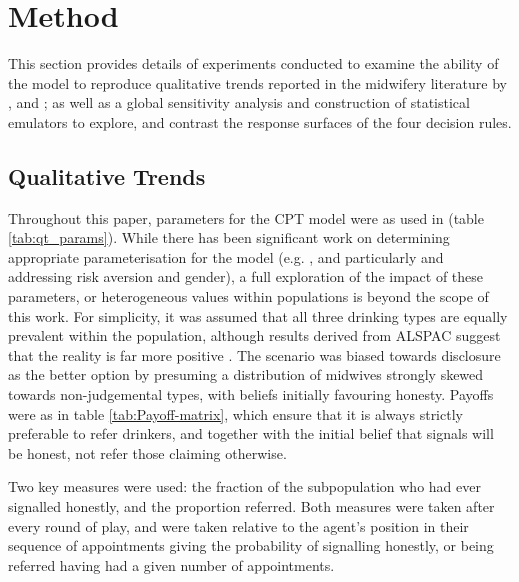 \section{Method}
\label{sec:method}

This section provides details of experiments conducted to examine the ability of the model to reproduce qualitative trends reported in the midwifery literature by \cite{Alvik2006}, and \cite{Phillips2007}; as well as a global sensitivity analysis and construction of statistical emulators to explore, and contrast the response surfaces of the four decision rules.

\subsection{Qualitative Trends}
\label{sub:qt}


Throughout this paper, parameters for the \ac{CPT} model were as used in \cite{Tversky1992} (table \ref{tab:qt_params}). While there has been significant work on determining appropriate parameterisation for the model (e.g. \cite{Neilson2002,Glockner2012,Nilsson2011}, and particularly \citet{Byrnes1999} and \citet{Booij2009} addressing risk aversion and gender), a full exploration of the impact of these parameters, or heterogeneous values within populations is beyond the scope of this work. For simplicity, it was assumed that all three drinking types are equally prevalent within the population, although results derived from \ac{ALSPAC} suggest that the reality is far more positive \citep{Humphriss2013}. The scenario was biased towards disclosure as the better option by presuming a distribution of midwives strongly skewed towards non-judgemental types, with beliefs initially favouring honesty. Payoffs were as in table \ref{tab:Payoff-matrix}, which ensure that it is always strictly preferable to refer drinkers, and together with the initial belief that signals will be honest, not refer those claiming otherwise.

Two key measures were used: the fraction of the subpopulation who had ever signalled honestly, and the proportion referred. Both measures were taken after every round of play, and were taken relative to the agent's position in their sequence of appointments giving the probability of signalling honestly, or being referred having had a given number of appointments.

